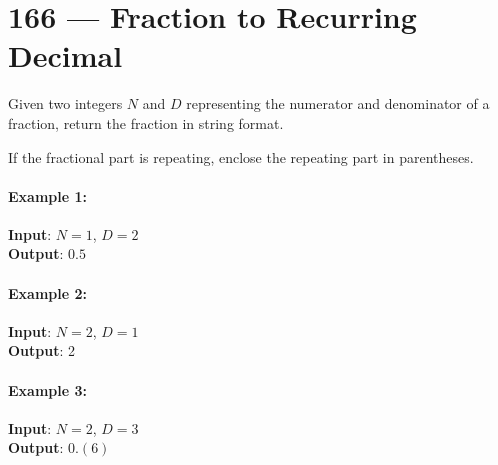 \section{166 --- Fraction to Recurring Decimal}
Given two integers $N$ and $D$ representing the numerator and denominator of a fraction, return the fraction in string format.
\par
If the fractional part is repeating, enclose the repeating part in parentheses.
\paragraph{Example 1:}
\begin{flushleft}
\textbf{Input}: $N = 1$, $D = 2$
\\
\textbf{Output}: $0.5$
\end{flushleft}
\paragraph{Example 2:}
\begin{flushleft}
\textbf{Input}: $N = 2$, $D = 1$
\\
\textbf{Output}: 2
\end{flushleft}
\paragraph{Example 3:}
\begin{flushleft}
\textbf{Input}: $N = 2$, $D = 3$
\\
\textbf{Output}: $0.(6)$
\end{flushleft}
